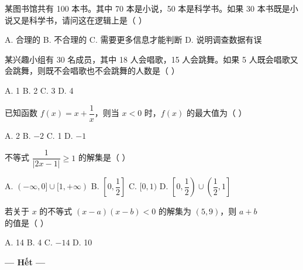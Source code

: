 \documentclass[11pt, a4paper]{article}
\begin{document}
\begin{baitap}[44]
某图书馆共有 100 本书。其中 70 本是小说，50 本是科学书。如果 30 本书既是小说又是科学书，请问这在逻辑上是（ ）
\par\vspace{3pt}
\noindent A. 合理的 \quad B. 不合理的 \quad C. 需要更多信息才能判断 \quad D. 说明调查数据有误
\end{baitap}

\begin{baitap}[45]
某兴趣小组有 30 名成员，其中 18 人会唱歌，15 人会跳舞。如果 5 人既会唱歌又会跳舞，则既不会唱歌也不会跳舞的人数是（ ）
\par\vspace{3pt}
\noindent A. 1 \quad B. 2 \quad C. 3 \quad D. 4
\end{baitap}

\begin{baitap}[46]
已知函数 $f(x)=x+\dfrac{1}{x}$，则当 $x<0$ 时，$f(x)$ 的最大值为（ ）
\par\vspace{3pt}
\noindent A. 2 \quad B. $-2$ \quad C. 1 \quad D. $-1$
\end{baitap}

\begin{baitap}[47]
不等式 $\dfrac{1}{\lvert 2x-1\rvert}\ge1$ 的解集是（ ）
\par\vspace{3pt}
\noindent A. $(-\infty,0]\cup[1,+\infty)$ \quad B. $\left[0,\dfrac{1}{2}\right]$ \quad C. $[0,1)$ \quad D. $\left[0,\dfrac{1}{2}\right)\cup\left(\dfrac{1}{2},1\right]$
\end{baitap}

\begin{baitap}[48]
若关于 $x$ 的不等式 $(x-a)(x-b)<0$ 的解集为 $(5,9)$，则 $a+b$ 的值是（ ）
\par\vspace{3pt}
\noindent A. 14 \quad B. 4 \quad C. $-14$ \quad D. 10
\end{baitap}

\vspace{0.5cm}
\begin{center}
\textbf{--- Hết ---}
\end{center}
\end{document}
